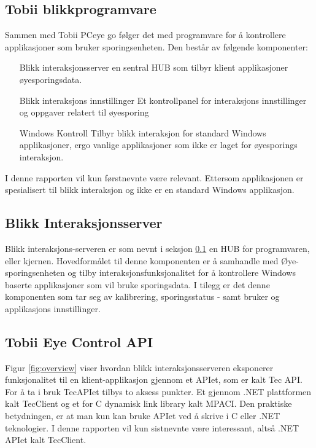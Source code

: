 \documentclass[phd,tocprelim]{cornell}
\begin{document}
\subsection{Tobii blikkprogramvare}
\label{subsec:blikk}

Sammen med Tobii PCeye go følger det med programvare for å kontrollere applikasjoner som bruker sporingsenheten. Den består av følgende komponenter: 

\begin{itemize}
\item [Blikk interaksjonsserver] en sentral HUB som tilbyr klient applikasjoner øyesporingsdata. 
\item [Blikk interaksjons innstillinger] Et kontrollpanel for interaksjons innstillinger og oppgaver relatert til øyesporing
\item [Windows Kontroll] Tilbyr blikk interaksjon for standard Windows applikasjoner, ergo vanlige applikasjoner som ikke er laget for øyesporings interaksjon.
\end{itemize}

I denne rapporten vil kun førstnevnte være relevant. Ettersom applikasjonen er spesialisert til blikk interaksjon og ikke er en standard Windows applikasjon.

\subsection{Blikk Interaksjonsserver}

Blikk interaksjons-serveren er som nevnt i seksjon \ref{subsec:blikk} en HUB for programvaren, eller kjernen. Hovedformålet til denne komponenten er å samhandle med Øye-sporingsenheten og tilby interaksjonsfunksjonalitet for å kontrollere Windows baserte applikasjoner som vil bruke sporingsdata. I tilegg er det denne komponenten som tar seg av kalibrering, sporingsstatus - samt bruker og applikasjons innstillinger.

\subsection{Tobii Eye Control API }

Figur \ref{fig:overview} viser hvordan blikk interaksjonsserveren eksponerer funksjonalitet til en klient-applikasjon gjennom et APIet, som er kalt Tec API. For å ta i bruk TecAPIet tilbys to aksess punkter. Et gjennom .NET plattformen kalt TecClient og et for C dynamisk link library kalt MPACI.  Den praktiske betydningen, er at man kun kan bruke APIet ved å skrive i C eller .NET teknologier. I denne rapporten vil kun sistnevnte være interessant, altså .NET APIet kalt TecClient.
\end{document}
